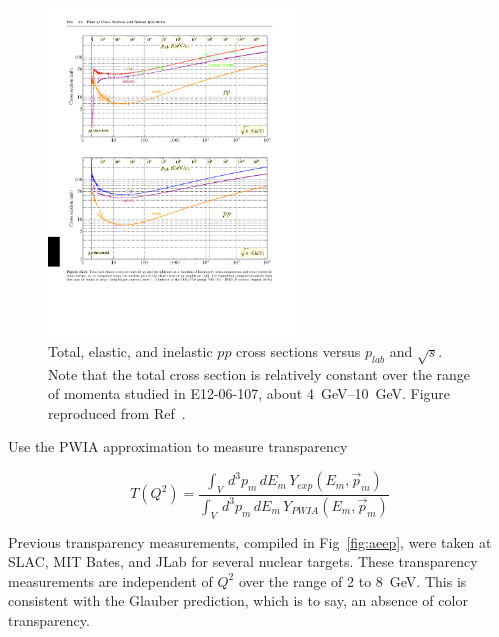 \begin{figure}[!h]
    \centering
    \includegraphics[width=0.6\textwidth]{chap2/pdg_pp_cross_section.pdf}
    \caption[Total, elastic, and inelastic $pp$ cross sections versus
             $p_{lab}$ and $\sqrt{s}$.]{
             Total, elastic, and inelastic $pp$ cross sections versus
             $p_{lab}$ and $\sqrt{s}$.
             Note that the total cross section is relatively constant over the
             range of momenta studied in E12-06-107, about
             \SIrange{4}{10}{\giga\electronvolt}.
             Figure reproduced from Ref~\cite{pdg_2020}.
            }
    \label{fig:pdg_pp_cross_section}
\end{figure}

Use the PWIA approximation to measure transparency

\begin{equation}
    T(Q^2) = \frac{\int_V \, d^3p_m \, dE_m \, Y_{exp}(E_m, \vec{p}_m)}
                  {\int_V \, d^3p_m \, dE_m \, Y_{PWIA}(E_m, \vec{p}_m)}
\end{equation}

Previous transparency measurements, compiled in Fig~\ref{fig:aeep}, were taken
at SLAC, MIT Bates, and JLab for several nuclear targets.
These transparency measurements are independent of $Q^2$ over the range of 2 to
\SI{8}{\giga\electronvolt}.
This is consistent with the Glauber prediction, which is to say, an absence of
color transparency.

